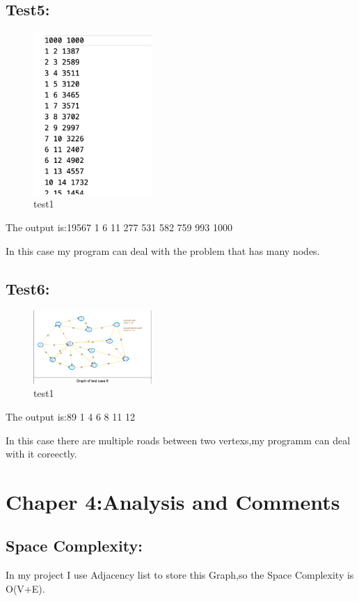 \documentclass[12pt]{article}
\begin{document}
\subsection*{Test5:}
\begin{figure}[H]
	\centering
	\includegraphics[width=0.4\textwidth]{6.png}
	\caption{\label{pr}test1}
	\end{figure}

The output is:19567 1 6 11 277 531 582 759 993 1000

In this case my program can deal with the problem that has many nodes.

\subsection*{Test6:}
\begin{figure}[H]
	\centering
	\includegraphics[width=0.4\textwidth]{7.png}
	\caption{\label{pr}test1}
	\end{figure}

The output is:89 1 4 6 8 11 12

In this case there are multiple roads between two vertexs,my programm can deal with it coreectly.

\section*{Chaper 4:Analysis and Comments}

\subsection*{Space Complexity:}
In my project I use Adjacency list to store this Graph,so the Space Complexity is O(V+E).
\end{document}
